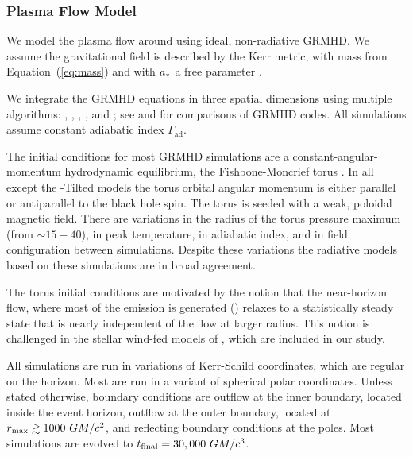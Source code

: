 \subsubsection{Plasma Flow Model}

We model the plasma flow around \sgra using ideal, non-radiative GRMHD.  We assume the gravitational field
is described by the Kerr metric, with mass from Equation~(\ref{eq:mass}) and with $a_*$ a free parameter \citep[see e.g.,][]{1999ApJ...522..727K,2003ApJ...589..444G, 2003ApJ...589..458D, 2005ApJ...635..723A, 2007A&A...473...11D}.

We integrate the GRMHD equations in three spatial dimensions using multiple algorithms:
\kharma   \citep{2021JOSS....6.3336P},
\bhac     \citep{2017ComAC...4....1P},
\hamr     \citep{Liska2019},
\koral    \citep{2013MNRAS.429.3533S}, and
\athenapp \citep{2016ApJS..225...22W};
see \citet{2019ApJS..243...26P} and \citet{Olivares_et_al} for comparisons of GRMHD codes.
All simulations assume constant adiabatic index  $\Gamma_\mathrm{ad}$.

The initial conditions for most GRMHD simulations  are a constant-angular-momentum hydrodynamic equilibrium, the Fishbone-Moncrief torus \citep{1976ApJ...207..962F}.  In all except the \hamr-Tilted models the torus orbital angular momentum is either parallel or antiparallel to the black hole spin.  The torus is seeded with a weak, poloidal magnetic field.  There are variations in the radius of the torus pressure maximum (from $\sim 15-40$), in peak temperature, in  adiabatic index, and in field configuration between simulations.  Despite these variations the radiative models based on these simulations are in broad agreement.

The torus initial conditions are motivated by the notion that the near-horizon flow, where most of the emission is generated () relaxes to a statistically steady state that is nearly independent of the flow at larger radius.  This notion is challenged in the stellar wind-fed models of \cite{2020ApJ...896L...6R}, which are included in our study.

All simulations are run in variations of Kerr-Schild coordinates, which are regular on the horizon.
Most are run in a variant of spherical polar coordinates.
Unless stated otherwise, boundary conditions are outflow at the inner boundary, located inside the event horizon, outflow at the outer boundary, located at $r_{\rm max} \gtrsim 1000~GM/c^2$, and reflecting boundary conditions at the poles.
Most simulations are evolved to $t_\mathrm{final} = 30,000~GM/c^3$.

